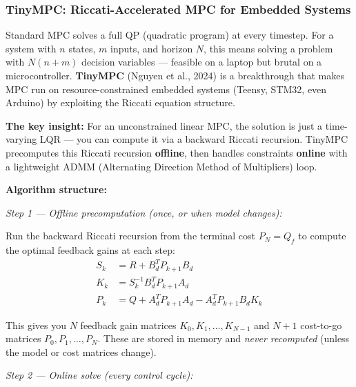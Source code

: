 \subsubsection{TinyMPC: Riccati-Accelerated MPC for Embedded Systems}

Standard MPC solves a full QP (quadratic program) at every timestep. For a system with $n$ states, $m$ inputs, and horizon $N$, this means solving a problem with $N(n+m)$ decision variables --- feasible on a laptop but brutal on a microcontroller. \textbf{TinyMPC} (Nguyen et al., 2024) is a breakthrough that makes MPC run on resource-constrained embedded systems (Teensy, STM32, even Arduino) by exploiting the Riccati equation structure.

\textbf{The key insight:} For an unconstrained linear MPC, the solution is just a time-varying LQR --- you can compute it via a backward Riccati recursion. TinyMPC precomputes this Riccati recursion \textbf{offline}, then handles constraints \textbf{online} with a lightweight ADMM (Alternating Direction Method of Multipliers) loop.

\textbf{Algorithm structure:}

\textit{Step 1 --- Offline precomputation (once, or when model changes):}

Run the backward Riccati recursion from the terminal cost $P_N = Q_f$ to compute the optimal feedback gains at each step:
\begin{align}
S_k &= R + B_d^T P_{k+1} B_d \\
K_k &= S_k^{-1} B_d^T P_{k+1} A_d \\
P_k &= Q + A_d^T P_{k+1} A_d - A_d^T P_{k+1} B_d K_k
\end{align}

This gives you $N$ feedback gain matrices $K_0, K_1, \ldots, K_{N-1}$ and $N+1$ cost-to-go matrices $P_0, P_1, \ldots, P_N$. These are stored in memory and \textit{never recomputed} (unless the model or cost matrices change).

\textit{Step 2 --- Online solve (every control cycle):}

